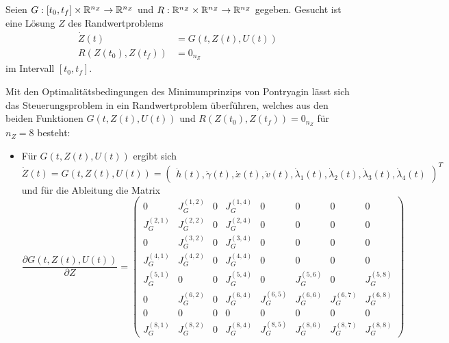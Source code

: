 \begin{problem}\label{prob:ZweiRand}
    Seien $G : [t_0,t_f] \times \mathbb{R}^{n_Z} \to \mathbb{R}^{n_Z}$ und $R : \mathbb{R}^{n_Z} \times \mathbb{R}^{n_Z} \to \mathbb{R}^{n_Z}$ gegeben. Gesucht ist eine Lösung $Z$ des Randwertproblems
    \begin{align}
        \dot{Z}(t) &= G(t,Z(t),U(t)) \\
        R(Z(t_0),Z(t_f)) &= 0_{n_Z}
    \end{align}
    im Intervall $[t_0,t_f]$.
\end{problem}

Mit den Optimalitätsbedingungen des Minimumprinzips von Pontryagin lässt sich das Steuerungsproblem in ein Randwertproblem überführen, welches aus den beiden Funktionen $G(t,Z(t),U(t))$ und $R(Z(t_0),Z(t_f)) = 0_{n_Z}$ für $n_Z = 8$ besteht:
\begin{itemize}
\item Für $G(t,Z(t),U(t))$ ergibt sich
\begin{equation} 
    \dot{Z}(t) = G(t,Z(t),U(t)) = 
    \begin{pmatrix}
        \dot{h}(t),\dot{\gamma}(t),\dot{x}(t),\dot{v}(t),\dot{\lambda}_1(t),\dot{\lambda}_2(t),\dot{\lambda}_3(t),\dot{\lambda}_4(t)
    \end{pmatrix}^T
\end{equation}
und für die Ableitung die Matrix
\begin{equation}\label{equ:jacobi}
    \dfrac{\partial G(t,Z(t),U(t))}{\partial Z} = 
    \begin{pmatrix}
        0 & J_G^{(1,2)} & 0 & J_G^{(1,4)} & 0 & 0 & 0 & 0 \\ 
        J_G^{(2,1)} & J_G^{(2,2)} & 0 & J_G^{(2,4)} & 0 & 0 & 0 & 0 \\ 
        0 & J_G^{(3,2)} & 0 & J_G^{(3,4)} & 0 & 0 & 0 & 0 \\ 
        J_G^{(4,1)} & J_G^{(4,2)} & 0 & J_G^{(4,4)} & 0 & 0 & 0 & 0 \\
        J_G^{(5,1)} & 0 & 0 & J_G^{(5,4)} & 0 & J_G^{(5,6)} & 0 & J_G^{(5,8)} \\
        0 & J_G^{(6,2)} & 0 & J_G^{(6,4)} & J_G^{(6,5)} & J_G^{(6,6)} & J_G^{(6,7)} & J_G^{(6,8)} \\
        0 & 0 & 0 & 0 & 0 & 0 & 0 & 0 \\
        J_G^{(8,1)} & J_G^{(8,2)} & 0 & J_G^{(8,4)} & J_G^{(8,5)} & J_G^{(8,6)} & J_G^{(8,7)} & J_G^{(8,8)}
    \end{pmatrix}
\end{equation}

\end{itemize}
